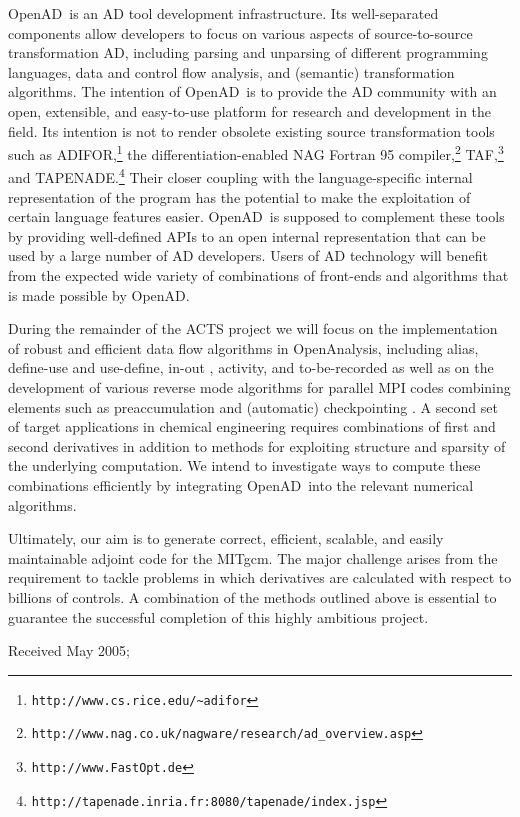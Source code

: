 \documentclass[acmtocl,acmnow]{acmtrans2m}
\newcommand{\OpenAD}{OpenAD}
\newcommand{\OpenAnalysis}{OpenAnalysis}
\begin{document}
\OpenAD\ is an AD tool development infrastructure. Its well-separated components
allow developers to focus on various aspects of source-to-source 
transformation AD, including parsing and unparsing of different programming
languages, data and control flow analysis, and (semantic) transformation 
algorithms. The intention of \OpenAD\ is to provide the AD community with 
an open, extensible, and easy-to-use platform for research and development
in the field. Its intention is not to render obsolete existing source transformation
tools such as ADIFOR,\footnote{{\tt http://www.cs.rice.edu/\~\!adifor}} 
the differentiation-enabled NAG Fortran 95 
compiler,\footnote{{\tt http://www.nag.co.uk/nagware/research/ad\_overview.asp}} TAF,\footnote{{\tt http://www.FastOpt.de}} and TAPENADE.\footnote{{\tt http://tapenade.inria.fr:8080/tapenade/index.jsp}} 
Their closer coupling with the language-specific internal representation of 
the program has the potential to make the
exploitation of certain language features easier. \OpenAD\ is supposed to 
complement these tools by providing well-defined APIs to an open internal 
representation that can be used by a large number of AD developers.
Users of AD technology will benefit from the expected wide
variety of combinations of front-ends and algorithms that is made possible
by \OpenAD.

During the remainder of the ACTS project we will focus on the implementation
of robust and efficient data flow algorithms in \OpenAnalysis, including alias, 
define-use and use-define, in-out \cite{Muc97}, 
activity, and to-be-recorded \cite{HNP02} as well as on 
the development of various reverse mode algorithms for parallel MPI codes
combining elements such as preaccumulation and (automatic) checkpointing
\cite{Gri92}. 
A second set of target 
applications in chemical engineering \cite{FTB97} requires combinations of first and 
second derivatives in addition to methods for exploiting structure and sparsity
of the underlying computation. We intend to investigate ways to compute these
combinations efficiently by integrating \OpenAD\ into the relevant 
numerical algorithms.

Ultimately, our aim is to generate correct, efficient, scalable, and easily 
maintainable adjoint code for the MITgcm. The major challenge arises from the
requirement to tackle problems in which derivatives are calculated with respect 
to billions of controls. A combination of the methods outlined above is 
essential to guarantee the successful completion of this highly ambitious
project.






\begin{received}
Received May 2005;
\end{received}
\end{document}
